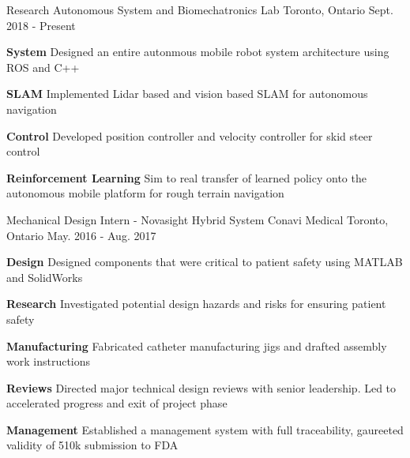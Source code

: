 \begin{cventries}
	\cventry
	{Research}
	{Autonomous System and Biomechatronics Lab}
	{Toronto, Ontario}
	{Sept. 2018 - Present}
	{
		\begin{cvitems}
			\item {
				\textbf{System} Designed an entire autonmous mobile robot system architecture using ROS and C++
			}
			\item {
				\textbf{SLAM} Implemented Lidar based and vision based SLAM for autonomous navigation
			}
			\item {
				\textbf{Control} Developed position controller and velocity controller for skid steer control
			}
			\item {
				\textbf{Reinforcement Learning} Sim to real transfer of learned policy onto the autonomous mobile platform for rough terrain navigation
			}
		\end{cvitems}
	}
	\cventry
	{Mechanical Design Intern - Novasight Hybrid System}
	{Conavi Medical} 
	{Toronto, Ontario}
	{May. 2016 - Aug. 2017}
	{
		\begin{cvitems}
			\item {
				\textbf{Design} Designed components that were critical to patient safety using MATLAB and SolidWorks
			}
			\item {
				\textbf{Research} Investigated potential design hazards and risks for ensuring patient safety
			}
			\item {
				\textbf{Manufacturing} Fabricated catheter manufacturing jigs and drafted assembly work instructions
			}
			\item {
				\textbf{Reviews} Directed major technical design reviews with senior leadership. Led to accelerated progress and exit of project phase
			}
			\item {
				\textbf{Management} Established a management system with full traceability, gaureeted validity of 510k submission to FDA
			}
		\end{cvitems}
	}  
\end{cventries}

